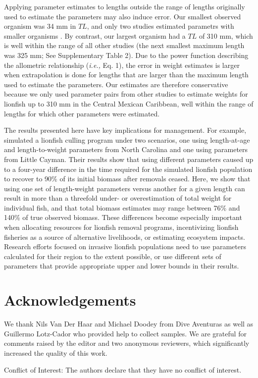 \documentclass[fleqn,10pt,lineno]{wlpeerj} %
\begin{document}
Applying parameter estimates to lengths outside the range of lengths
originally used to estimate the parameters may also induce error. Our
smallest observed organism was 34 mm in \(TL\), and only two studies
estimated parametrs with smaller organisms
\citep{edwards_2014,sabidoitza_2016}. By contrast, our largest organism
had a \(TL\) of 310 mm, which is well within the range of all other
studies (the next smallest maximum length was 325 mm; See Supplementary
Table 2). Due to the power function describing the allometric
relationship (\emph{i.e.,} Eq. 1), the error in weight estimates is
larger when extrapolation is done for lengths that are larger than the
maximum length used to estimate the parameters. Our estimates are
therefore conservative because we only used parameter pairs from other
studies to estimate weights for lionfish up to 310 mm in the Central
Mexican Caribbean, well within the range of lengths for which other
parameters were estimated.

The results presented here have key implications for management. For
example, \citet{edwards_2014} simulated a lionfish culling program under
two scenarios, one using length-at-age and length-to-weight parameters
from North Carolina and one using parameters from Little Cayman. Their
results show that using different parameters caused up to a four-year
difference in the time required for the simulated lionfish population to
recover to 90\% of its initial biomass after removals ceased. Here, we
show that using one set of length-weight parameters versus another for a
given length can result in more than a threefold under- or
overestimation of total weight for individual fish, and that total
biomass estimates may range between 76\% and 140\% of true observed
biomass. These differences become especially important when allocating
resources for lionfish removal programs, incentivizing lionfish
fisheries as a source of alternative livelihoods, or estimating
ecosystem impacts. Research efforts focused on invasive lionfish
populations need to use parameters calculated for their region to the
extent possible, or use different sets of parameters that provide
appropriate upper and lower bounds in their results.

\section*{Acknowledgements}

We thank Nils Van Der Haar and Michael Doodey from Dive Aventuras as
well as Guillermo Lotz-Cador who provided help to collect samples. We
are grateful for comments raised by the editor and two anonymous
reviewers, which significantly increased the quality of this work.

Conflict of Interest: The authors declare that they have no conflict of
interest.


\end{document}
